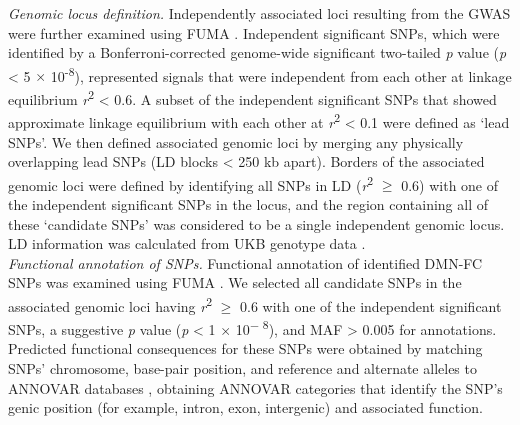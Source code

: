 \begin{refsection}
\noindent
\textit{Genomic locus definition. }Independently associated loci resulting from the GWAS were further examined using FUMA \citep{watanabe2017functional}. Independent significant SNPs, which were identified by a Bonferroni-corrected genome-wide significant two-tailed \textit{p} value (\textit{p} < 5 $ \times $ 10\textsuperscript{-8}), represented signals that were independent from each other at linkage equilibrium \textit{r}\textsuperscript{2} < 0.6. A subset of the independent significant SNPs that showed approximate linkage equilibrium with each other at \textit{r}\textsuperscript{2} < 0.1 were defined as ‘lead SNPs’. We then defined associated genomic loci by merging any physically overlapping lead SNPs (LD blocks < 250 kb apart). Borders of the associated genomic loci were defined by identifying all SNPs in LD (\textit{r}\textsuperscript{2} $ \geq $  0.6) with one of the independent significant SNPs in the locus, and the region containing all of these ‘candidate SNPs’ was considered to be a single independent genomic locus. LD information was calculated from UKB genotype data  \citep{Savage2018GenomewideAM}.\\

\noindent
\textit{Functional annotation of SNPs.} Functional annotation of identified DMN-FC SNPs was examined using FUMA \citep{watanabe2017functional}. We selected all candidate SNPs in the associated genomic loci having \textit{r}\textsuperscript{2} $ \geq $  0.6 with one of the independent significant SNPs, a suggestive \textit{p} value (\textit{p} < 1 $ \times $  10\textsuperscript{$-$ 8}), and MAF > 0.005 for annotations. Predicted functional consequences for these SNPs were obtained by matching SNPs’ chromosome, base-pair position, and reference and alternate alleles to ANNOVAR databases \citep{Wang2010ANNOVARFA}, obtaining ANNOVAR categories that identify the SNP’s genic position (for example, intron, exon, intergenic) and associated function.\\


\end{refsection}
